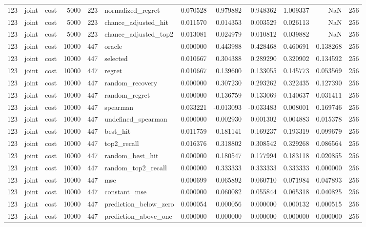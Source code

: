 \begin{tabular}{rllrrlrrrrrr}
123 & joint & cost & 5000 & 223 & normalized_regret & 0.070528 & 0.979882 & 0.948362 & 1.009337 & NaN & 256 \\
123 & joint & cost & 5000 & 223 & chance_adjusted_hit & 0.011570 & 0.014353 & 0.003529 & 0.026113 & NaN & 256 \\
123 & joint & cost & 5000 & 223 & chance_adjusted_top2 & 0.013081 & 0.024979 & 0.010812 & 0.039882 & NaN & 256 \\
123 & joint & cost & 10000 & 447 & oracle & 0.000000 & 0.443988 & 0.428468 & 0.460691 & 0.138268 & 256 \\
123 & joint & cost & 10000 & 447 & selected & 0.010667 & 0.304388 & 0.289290 & 0.320902 & 0.134592 & 256 \\
123 & joint & cost & 10000 & 447 & regret & 0.010667 & 0.139600 & 0.133055 & 0.145773 & 0.053569 & 256 \\
123 & joint & cost & 10000 & 447 & random_recovery & 0.000000 & 0.307230 & 0.293262 & 0.322435 & 0.127390 & 256 \\
123 & joint & cost & 10000 & 447 & random_regret & 0.000000 & 0.136759 & 0.133069 & 0.140637 & 0.031411 & 256 \\
123 & joint & cost & 10000 & 447 & spearman & 0.033221 & -0.013093 & -0.033483 & 0.008001 & 0.169746 & 256 \\
123 & joint & cost & 10000 & 447 & undefined_spearman & 0.000000 & 0.002930 & 0.001302 & 0.004883 & 0.015378 & 256 \\
123 & joint & cost & 10000 & 447 & best_hit & 0.011759 & 0.181141 & 0.169237 & 0.193319 & 0.099679 & 256 \\
123 & joint & cost & 10000 & 447 & top2_recall & 0.016376 & 0.318802 & 0.308542 & 0.329268 & 0.086564 & 256 \\
123 & joint & cost & 10000 & 447 & random_best_hit & 0.000000 & 0.180547 & 0.177994 & 0.183118 & 0.020855 & 256 \\
123 & joint & cost & 10000 & 447 & random_top2_recall & 0.000000 & 0.333333 & 0.333333 & 0.333333 & 0.000000 & 256 \\
123 & joint & cost & 10000 & 447 & mse & 0.000699 & 0.065892 & 0.060710 & 0.071984 & 0.047893 & 256 \\
123 & joint & cost & 10000 & 447 & constant_mse & 0.000000 & 0.060082 & 0.055844 & 0.065318 & 0.040825 & 256 \\
123 & joint & cost & 10000 & 447 & prediction_below_zero & 0.000054 & 0.000056 & 0.000000 & 0.000132 & 0.000515 & 256 \\
123 & joint & cost & 10000 & 447 & prediction_above_one & 0.000000 & 0.000000 & 0.000000 & 0.000000 & 0.000000 & 256 \\

\end{tabular}
